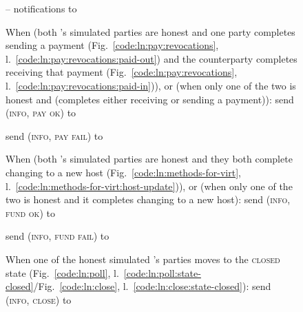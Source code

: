 \begin{figure}[H]
\begin{simulatorbox}{\simulator{} -- notifications to \fchan}
\begin{algorithmic}[1]
      \State When (both \fchan's simulated parties are honest and one party
      completes sending a payment (Fig.~\ref{code:ln:pay:revocations},
      l.~\ref{code:ln:pay:revocations:paid-out}) and the counterparty completes
      receiving that payment (Fig.~\ref{code:ln:pay:revocations},
      l.~\ref{code:ln:pay:revocations:paid-in})), or (when only one of the two
      is honest and (completes either receiving or sending a payment)):
      \Indent
        \State send (\textsc{info}, \textsc{pay ok}) to \fchan
      \EndIndent
      \Statex

      \State \TODO{}
      \Indent
        \State send (\textsc{info}, \textsc{pay fail}) to \fchan
      \EndIndent
      \Statex

      \State When (both \fchan's simulated parties are honest and they both
      complete changing to a new host (Fig.~\ref{code:ln:methods-for-virt},
      l.~\ref{code:ln:methods-for-virt:host-update})), or (when only one of the
      two is honest and it completes changing to a new host): 
      \Indent
        \State send (\textsc{info}, \textsc{fund ok}) to \fchan
      \EndIndent
      \Statex

      \State \TODO{}
      \Indent
        \State send (\textsc{info}, \textsc{fund fail}) to \fchan
      \EndIndent
      \Statex

      \State When one of the honest simulated \fchan's parties moves to the
      \textsc{closed} state (Fig.~\ref{code:ln:poll},
      l.~\ref{code:ln:poll:state-closed}/Fig.~\ref{code:ln:close},
      l.~\ref{code:ln:close:state-closed}):
      \Indent
        \State send (\textsc{info}, \textsc{close}) to \fchan
      \EndIndent
    \end{algorithmic}
  \end{simulatorbox}
  \caption{}
  \label{code:simulator}
\end{figure}
